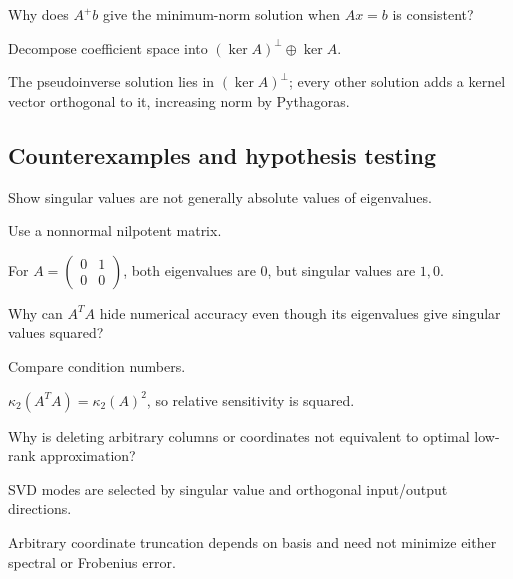\begin{exercise}\label{exr:i18-expand-09}
Why does \(A^+b\) give the minimum-norm solution when \(Ax=b\) is consistent?
\end{exercise}
\begin{hint}
Decompose coefficient space into \((\ker A)^\perp\oplus\ker A\).
\end{hint}
\begin{solution}
The pseudoinverse solution lies in \((\ker A)^\perp\); every other solution adds a kernel vector orthogonal to it, increasing norm by Pythagoras.
\end{solution}

\subsection*{Counterexamples and hypothesis testing}

\begin{exercise}\label{exr:i18-expand-10}
Show singular values are not generally absolute values of eigenvalues.
\end{exercise}
\begin{hint}
Use a nonnormal nilpotent matrix.
\end{hint}
\begin{solution}
For \(A=\begin{pmatrix}0&1\\0&0\end{pmatrix}\), both eigenvalues are \(0\), but singular values are \(1,0\).
\end{solution}

\begin{exercise}\label{exr:i18-expand-11}
Why can \(A^TA\) hide numerical accuracy even though its eigenvalues give singular values squared?
\end{exercise}
\begin{hint}
Compare condition numbers.
\end{hint}
\begin{solution}
\(\kappa_2(A^TA)=\kappa_2(A)^2\), so relative sensitivity is squared.
\end{solution}

\begin{exercise}\label{exr:i18-expand-12}
Why is deleting arbitrary columns or coordinates not equivalent to optimal low-rank approximation?
\end{exercise}
\begin{hint}
SVD modes are selected by singular value and orthogonal input/output directions.
\end{hint}
\begin{solution}
Arbitrary coordinate truncation depends on basis and need not minimize either spectral or Frobenius error.
\end{solution}


